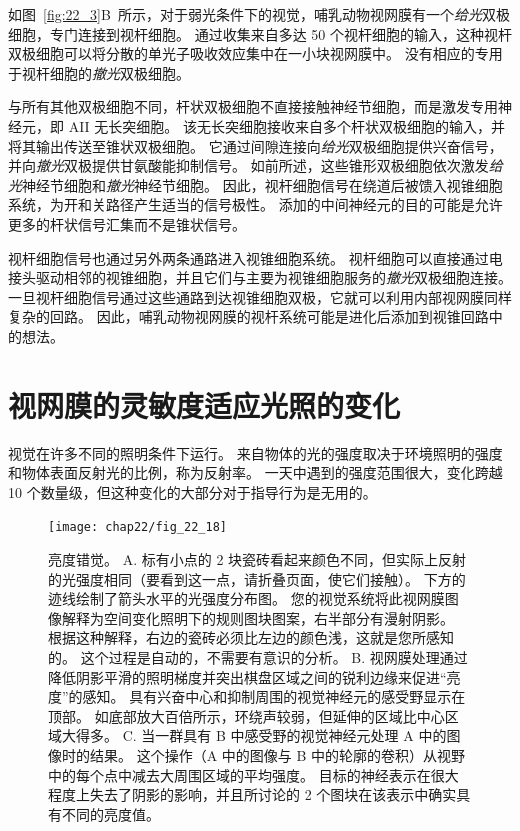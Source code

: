 如图~\ref{fig:22_3}B~所示，对于弱光条件下的视觉，哺乳动物视网膜有一个\textit{给光}双极细胞，专门连接到视杆细胞。
通过收集来自多达 50 个视杆细胞的输入，这种视杆双极细胞可以将分散的单光子吸收效应集中在一小块视网膜中。
没有相应的专用于视杆细胞的\textit{撤光}双极细胞。


与所有其他双极细胞不同，杆状双极细胞不直接接触神经节细胞，而是激发专用神经元，即 AII 无长突细胞。
该无长突细胞接收来自多个杆状双极细胞的输入，并将其输出传送至锥状双极细胞。
它通过间隙连接向\textit{给光}双极细胞提供兴奋信号，并向\textit{撤光}双极提供甘氨酸能抑制信号。
如前所述，这些锥形双极细胞依次激发\textit{给光}神经节细胞和\textit{撤光}神经节细胞。
因此，视杆细胞信号在绕道后被馈入视锥细胞系统，为开和关路径产生适当的信号极性。
添加的中间神经元的目的可能是允许更多的杆状信号汇集而不是锥状信号。


视杆细胞信号也通过另外两条通路进入视锥细胞系统。
视杆细胞可以直接通过电接头驱动相邻的视锥细胞，并且它们与主要为视锥细胞服务的\textit{撤光}双极细胞连接。
一旦视杆细胞信号通过这些通路到达视锥细胞双极，它就可以利用内部视网膜同样复杂的回路。
因此，哺乳动物视网膜的视杆系统可能是进化后添加到视锥回路中的想法。



\section{视网膜的灵敏度适应光照的变化}

视觉在许多不同的照明条件下运行。
来自物体的光的强度取决于环境照明的强度和物体表面反射光的比例，称为反射率。
一天中遇到的强度范围很大，变化跨越 10 个数量级，但这种变化的大部分对于指导行为是无用的。


\begin{figure}[htbp]
	\centering
	\texttt{[image: chap22/fig\_22\_18]}
	\caption{亮度错觉。 
		A. 标有小点的 2 块瓷砖看起来颜色不同，但实际上反射的光强度相同（要看到这一点，请折叠页面，使它们接触）。
		下方的迹线绘制了箭头水平的光强度分布图。 
		您的视觉系统将此视网膜图像解释为空间变化照明下的规则图块图案，右半部分有漫射阴影。 
		根据这种解释，右边的瓷砖必须比左边的颜色浅，这就是您所感知的。
		这个过程是自动的，不需要有意识的分析。 
		B. 视网膜处理通过降低阴影平滑的照明梯度并突出棋盘区域之间的锐利边缘来促进“亮度”的感知。 
		具有兴奋中心和抑制周围的视觉神经元的感受野显示在顶部。 
		如底部放大百倍所示，环绕声较弱，但延伸的区域比中心区域大得多。
		C. 当一群具有 B 中感受野的视觉神经元处理 A 中的图像时的结果。
		这个操作（A 中的图像与 B 中的轮廓的卷积）从视野中的每个点中减去大周围区域的平均强度。
		目标的神经表示在很大程度上失去了阴影的影响，并且所讨论的 2 个图块在该表示中确实具有不同的亮度值。}
	\label{fig:22_18}
\end{figure}


